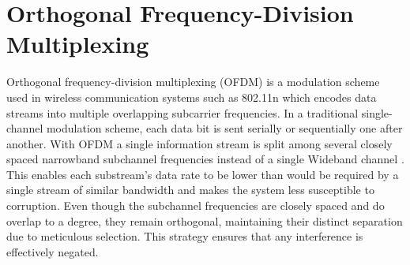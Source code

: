 \documentclass[binding=0.7cm, oneside]{sapthesis}
\begin{document}
\section{Orthogonal Frequency-Division Multiplexing}
Orthogonal frequency-division multiplexing (OFDM) is a modulation scheme used in wireless communication systems such as 802.11n
which encodes data streams into multiple overlapping subcarrier frequencies. In a traditional single-channel modulation scheme,
each data bit is sent serially or sequentially one after another. With OFDM a single information stream is split among several
closely spaced narrowband subchannel frequencies instead of a single Wideband channel \cite{OFDM_basics}. This enables each substream's
data rate to be lower than would be required by a single stream of similar bandwidth and makes the system less susceptible to corruption.
Even though the subchannel frequencies are closely spaced and do overlap to a degree,
they remain orthogonal, maintaining their distinct separation due to meticulous selection.
This strategy ensures that any interference is effectively negated.
\end{document}
